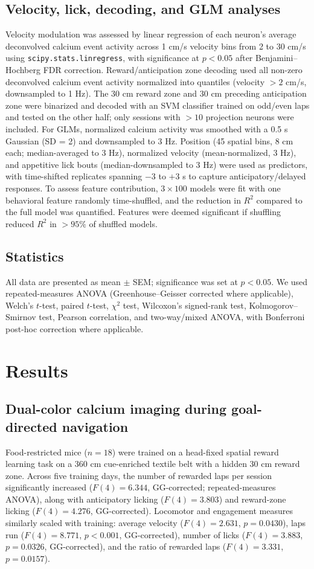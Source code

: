 \documentclass[10pt,a4paper]{article}
\begin{document}
\subsection{Velocity, lick, decoding, and GLM analyses}
Velocity modulation was assessed by linear regression of each neuron's average deconvolved calcium event activity across 1 cm/s velocity bins from 2 to 30 cm/s using \texttt{scipy.stats.linregress}, with significance at $p<0.05$ after Benjamini--Hochberg FDR correction. Reward/anticipation zone decoding used all non-zero deconvolved calcium event activity normalized into quantiles (velocity $>2$ cm/s, downsampled to 1 Hz). The 30 cm reward zone and 30 cm preceding anticipation zone were binarized and decoded with an SVM classifier trained on odd/even laps and tested on the other half; only sessions with $>10$ projection neurons were included. For GLMs, normalized calcium activity was smoothed with a 0.5 s Gaussian (SD = 2) and downsampled to 3 Hz. Position (45 spatial bins, 8 cm each; median-averaged to 3 Hz), normalized velocity (mean-normalized, 3 Hz), and appetitive lick bouts (median-downsampled to 3 Hz) were used as predictors, with time-shifted replicates spanning $-3$ to $+3$ s to capture anticipatory/delayed responses. To assess feature contribution, $3\times100$ models were fit with one behavioral feature randomly time-shuffled, and the reduction in $R^2$ compared to the full model was quantified. Features were deemed significant if shuffling reduced $R^2$ in $>95\%$ of shuffled models.

\subsection{Statistics}
All data are presented as mean $\pm$ SEM; significance was set at $p<0.05$. We used repeated-measures ANOVA (Greenhouse--Geisser corrected where applicable), Welch's $t$-test, paired $t$-test, $\chi^2$ test, Wilcoxon's signed-rank test, Kolmogorov--Smirnov test, Pearson correlation, and two-way/mixed ANOVA, with Bonferroni post-hoc correction where applicable.

\section{Results}
\subsection{Dual-color calcium imaging during goal-directed navigation}
Food-restricted mice ($n=18$) were trained on a head-fixed spatial reward learning task on a 360 cm cue-enriched textile belt with a hidden 30 cm reward zone. Across five training days, the number of rewarded laps per session significantly increased ($F(4)=6.344$, GG-corrected; repeated-measures ANOVA), along with anticipatory licking ($F(4)=3.803$) and reward-zone licking ($F(4)=4.276$, GG-corrected). Locomotor and engagement measures similarly scaled with training: average velocity ($F(4)=2.631$, $p=0.0430$), laps run ($F(4)=8.771$, $p<0.001$, GG-corrected), number of licks ($F(4)=3.883$, $p=0.0326$, GG-corrected), and the ratio of rewarded laps ($F(4)=3.331$, $p=0.0157$).
\end{document}
